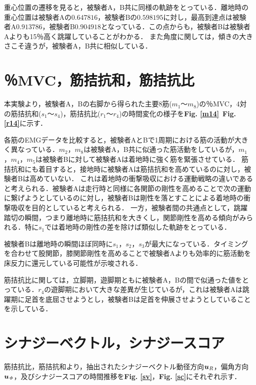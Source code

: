  重心位置の遷移を見ると，被験者A，B共に同様の軌跡をとっている．離地時の重心位置は被験者Aの$0.647816$，被験者Bの$0.598195$に対し，最高到達点は被験者A$0.913786$，被験者B$0.904918$となっている．この点からも，被験者Bは被験者Aよりも15％高く跳躍していることがわかる．
 また角度に関しては，傾きの大きさこそ違うが，被験者A，B共に相似している．
 
 \newpage

\section{％MVC，筋拮抗和，筋拮抗比}
本実験より，被験者A，Bの右脚から得られた主要8筋($m_1$～$m_8$)の％MVC，4対の筋拮抗和($s_1$～$s_4$)，筋拮抗比($r_1$～$r_4$)の時間変化の様子を{\bf Fig. \ref{m14}}~{\bf Fig. \ref{r14}}に示す．
 
\newpage 
各筋のEMGデータを比較すると，被験者AとBで1周期における筋の活動が大きく異なっている．$m_2$，$m_8$は被験者A，B共に似通った筋活動をしているが，$m_1$，$m_4$，$m_5$は被験者Bに対して被験者Aは着地時に強く筋を緊張させている．
 筋拮抗和にも着目すると，接地時に被験者Aは筋拮抗和を高めているのに対し，被験者Bは高めていない．
これは着地時の衝撃吸収における運動戦略の違いであると考えられる．被験者Aは走行時と同様に各関節の剛性を高めることで次の運動に繋げようとしているのに対し，被験者Bは剛性を落とすことによる着地時の衝撃吸収を目的としていると考えられる．
一方，被験者間の共通点として，跳躍踏切の瞬間，つまり離地時に筋拮抗和を大きくし，関節剛性を高める傾向がみられる．特に$s_1$では着地時の剛性の差を除けば類似した軌跡をとっている．

被験者Bは離地時の瞬間ほぼ同時に$s_1$，$s_2$，$s_3$が最大になっている．タイミングを合わせて股関節，膝関節剛性を高めることで被験者Aよりも効率的に筋活動を床反力に還元している可能性が示唆される．

筋拮抗比に関しては，立脚期，遊脚期ともに被験者A，Bの間で似通った値をとっている．$r_4$の遊脚期において大きな差異が生じているが，これは被験者Aは跳躍期に足首を底屈させようとし，被験者Bは足首を伸展させようとしていることを示している．


\newpage
 \section{シナジーベクトル，シナジースコア} 
筋拮抗比，筋拮抗和より，抽出されたシナジーベクトル動径方向$\mbox{\boldmath{$u$}}_R$，偏角方向$\mbox{\boldmath{$u$}}_{\it \Phi}$，及びシナジースコアの時間推移を{\bf Fig. \ref{sv}}，{\bf Fig. \ref{sc}}にそれぞれ示す．

